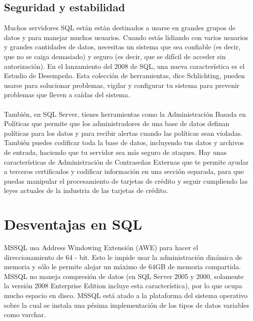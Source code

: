 \documentclass[preprint,12pt]{elsarticle}
\begin{document}
\subsection{Seguridad y estabilidad}
Muchos servidores SQL están están destinados a usarse en grandes grupos de datos y para manejar muchos usuarios. Cuando estás lidiando con varios usuarios y grandes cantidades de datos, necesitas un sistema que sea confiable (es decir, que no se caiga demasiado) y seguro (es decir, que se difícil de acceder sin autorización). En el lanzamiento del 2008 de SQL, una nueva característica es el Estudio de Desempeño. Esta colección de herramientas, dice Schlichting, pueden usarse para solucionar problemas, vigilar y configurar tu sistema para prevenir problemas que lleven a caídas del sistema.
\\
\\
 También, en SQL Server, tienes herramientas como la Administración Basada en Políticas que permite que los administradores de una base de datos definan políticas para los datos y para recibir alertas cuando las políticas sean violadas. También puedes codificar toda la base de datos, incluyendo tus datos y archivos de entrada, haciendo que tu servidor sea más seguro de ataques. Hay unas características de Administración de Contraseñas Externas que te permite ayudar a terceros certificados y codificar información en una sección separada, para que puedas manipular el procesamiento de tarjetas de crédito y seguir cumpliendo las leyes actuales de la industria de las tarjetas de crédito.  \cite{DLake01}	

\section{Desventajas en SQL}
MSSQL usa Address Windowing Extensión (AWE) para hacer el direccionamiento de 64 - bit. Esto le impide usar la administración dinámica de memoria y sólo le permite alojar un máximo de 64GB de memoria compartida. MSSQL no maneja compresión de datos (en SQL Server 2005 y 2000, solamente la versión 2008 Enterprise Edition incluye esta característica), por lo que ocupa mucho espacio en disco. MSSQL está atado a la plataforma del sistema operativo sobre la cual se instala una pésima implementación de los tipos de datos variables como varchar.\cite{DLake02}
\end{document}
